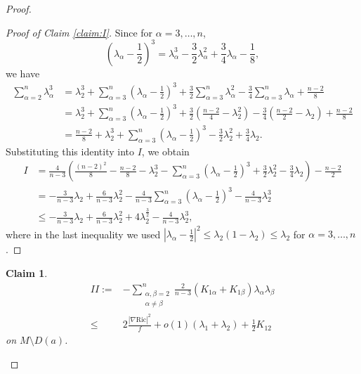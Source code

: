 \documentclass[a4, 12pt]{amsart}
\theoremstyle{plain}
\newtheorem{claim}{Claim}[section]
\begin{document}
\begin{proof}
\begin{proof}[Proof of Claim \ref{claim:I}]
		Since for $\alpha = 3, \ldots, n$,
		\[
		\left(\lambda_\alpha - \frac{1}{2}\right)^3 = \lambda_\alpha^3 - \frac{3}{2}\lambda_\alpha^2 + \frac{3}{4}\lambda_\alpha - \frac{1}{8},
		\]
		we have
		\begin{align*}
			\sum_{\alpha=2}^n \lambda_\alpha^3 &= \lambda_2^3 + \sum_{\alpha=3}^n\left(\lambda_\alpha - \frac{1}{2}\right)^3 + \frac{3}{2}\sum_{\alpha=3}^n\lambda_\alpha^2 - \frac{3}{4}\sum_{\alpha=3}^n\lambda_\alpha + \frac{n-2}{8} \\
			&= \lambda_2^3 + \sum_{\alpha=3}^n\left(\lambda_\alpha - \frac{1}{2}\right)^3 + \frac{3}{2}\left(\frac{n-2}{4} - \lambda_2^2\right) - \frac{3}{4}\left(\frac{n-2}{2} - \lambda_2\right) + \frac{n-2}{8} \\
			&= \frac{n-2}{8} + \lambda_2^3 + \sum_{\alpha=3}^n\left(\lambda_\alpha - \frac{1}{2}\right)^3 - \frac{3}{2}\lambda_2^2 + \frac{3}{4}\lambda_2.
		\end{align*}
		Substituting this identity into $I$, we obtain
		\begin{align*}
			I &= \frac{4}{n-3}\left(\frac{(n-2)^2}{8} - \frac{n-2}{8} - \lambda_2^3 - \sum_{\alpha=3}^n\left(\lambda_\alpha - \frac{1}{2}\right)^3 + \frac{3}{2}\lambda_2^2 - \frac{3}{4}\lambda_2\right) - \frac{n-2}{2} \\
			&= -\frac{3}{n-3}\lambda_2 + \frac{6}{n-3}\lambda_2^2 - \frac{4}{n-3}\sum_{\alpha=3}^n\left(\lambda_\alpha - \frac{1}{2}\right)^3 - \frac{4}{n-3}\lambda_2^3 \\
			&\leq -\frac{3}{n-3}\lambda_2 + \frac{6}{n-3}\lambda_2^2 + 4\lambda_2^{\frac{3}{2}} - \frac{4}{n-3}\lambda_2^3,
		\end{align*}
		where in the last inequality we used $|\lambda_{\alpha} - \frac{1}{2}|^2 \leq \lambda_2(1-\lambda_2) \leq \lambda_2$ for $\alpha = 3, \ldots, n$.
	\end{proof}
	
	
	\begin{claim}\label{claim:II}
		\begin{equation*}\label{eq:claim-II}
			\begin{aligned}	
			II  :=& -\sum_{\substack{\alpha,\beta=2 \\ \alpha\neq\beta}}^n \frac{2}{n-3}(K_{1\alpha} + K_{1\beta})\lambda_\alpha\lambda_\beta\\
			\leq& 2\frac{|\nabla \mathrm{Ric}|^2}{f} + o(1)(\lambda_1+\lambda_2) + \frac{1}{2}K_{12}
				\end{aligned}
		\end{equation*}
		on $M \setminus D(a)$.
	\end{claim}
	

\end{proof}
\end{document}
